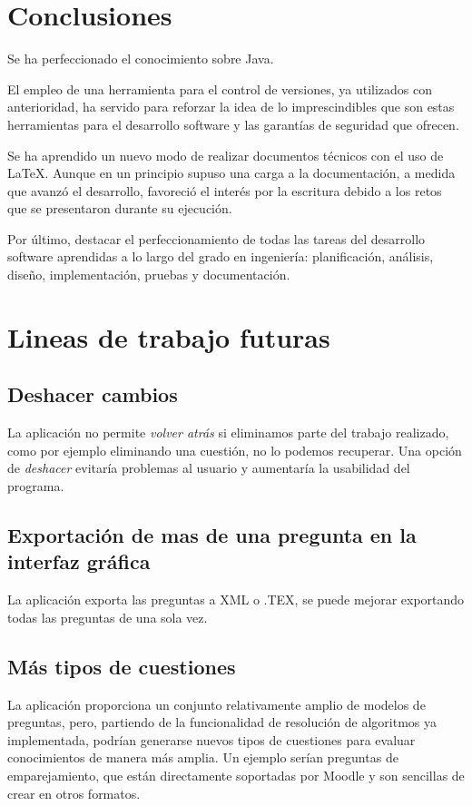 \section{Conclusiones}

Se ha perfeccionado el conocimiento sobre Java.

El empleo de una herramienta para el control de versiones, ya utilizados con anterioridad,
ha servido para reforzar la idea de lo imprescindibles que son estas herramientas para el
desarrollo software y las garantías de seguridad que ofrecen.

Se ha aprendido un nuevo modo de realizar documentos técnicos con el uso de \LaTeX{}. Aunque
en un principio supuso una carga a la documentación, a medida que avanzó el desarrollo, favoreció el interés por la escritura debido a los retos que se presentaron durante su ejecución.

Por último, destacar el perfeccionamiento de todas las tareas del desarrollo software aprendidas a lo largo del grado en ingeniería: planificación,
análisis, diseño, implementación, pruebas y documentación.
\section{Lineas de trabajo futuras}

\subsection{Deshacer cambios}
La aplicación no permite \textit{volver atrás} si  eliminamos  parte  del trabajo realizado, como por ejemplo eliminando una cuestión, no lo podemos recuperar. Una opción de \textit{deshacer} evitaría problemas al usuario y aumentaría la usabilidad del programa.
\subsection{Exportación de mas de una pregunta en la interfaz gráfica}
 La aplicación exporta las preguntas a XML o .TEX, se puede mejorar exportando todas las preguntas de una sola vez.
\subsection{Más tipos de cuestiones}
  La aplicación proporciona un conjunto relativamente amplio de modelos de preguntas, pero, partiendo de la funcionalidad de resolución de algoritmos ya implementada, podrían generarse nuevos tipos de cuestiones para evaluar conocimientos de manera más amplia. Un ejemplo serían preguntas de emparejamiento, que están directamente soportadas por Moodle y son sencillas de crear en otros formatos.
  
